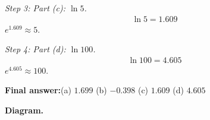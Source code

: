 \documentclass[11pt]{article}
\begin{document}
\textit{Step 3: Part (c): \( \ln 5 \).}
\[\begin{gathered}
\ln 5 = 1.609
\end{gathered}\]
\( e^{1.609} \approx 5 \).

\textit{Step 4: Part (d): \( \ln 100 \).}
\[\begin{gathered}
\ln 100 = 4.605
\end{gathered}\]
\( e^{4.605} \approx 100 \).

\begin{answerbox}
\textbf{Final answer:}\quad (a) \(\displaystyle  1.699 \) \quad  (b) \(\displaystyle  -0.398 \) \quad  (c) \(\displaystyle  1.609 \) \quad  (d) \(\displaystyle  4.605 \)
\end{answerbox}
\textbf{Diagram.}

\begin{center}
\end{center}
\end{document}
